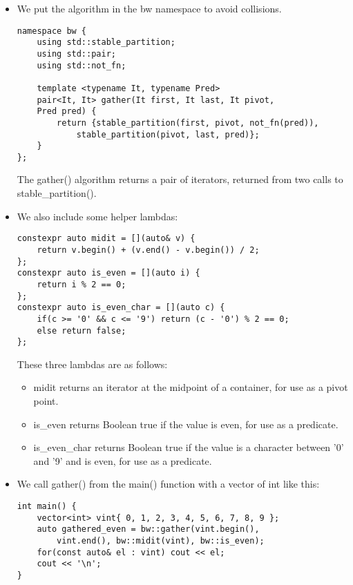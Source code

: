 \begin{itemize}
\item 
We put the algorithm in the bw namespace to avoid collisions.

\begin{lstlisting}[style=styleCXX]
namespace bw {
	using std::stable_partition;
	using std::pair;
	using std::not_fn;
	
	template <typename It, typename Pred>
	pair<It, It> gather(It first, It last, It pivot,
	Pred pred) {
		return {stable_partition(first, pivot, not_fn(pred)),
			stable_partition(pivot, last, pred)};
	}
};
\end{lstlisting}

The gather() algorithm returns a pair of iterators, returned from two calls to stable\_partition().

\item 
We also include some helper lambdas:

\begin{lstlisting}[style=styleCXX]
constexpr auto midit = [](auto& v) {
	return v.begin() + (v.end() - v.begin()) / 2;
};
constexpr auto is_even = [](auto i) {
	return i % 2 == 0;
};
constexpr auto is_even_char = [](auto c) {
	if(c >= '0' && c <= '9') return (c - '0') % 2 == 0;
	else return false;
};
\end{lstlisting}

These three lambdas are as follows:

\begin{itemize}
\item 
midit returns an iterator at the midpoint of a container, for use as a pivot point.

\item 
is\_even returns Boolean true if the value is even, for use as a predicate.

\item 
is\_even\_char returns Boolean true if the value is a character between '0' and '9' and is even, for use as a predicate.
\end{itemize}

\item 
We call gather() from the main() function with a vector of int like this:

\begin{lstlisting}[style=styleCXX]
int main() {
	vector<int> vint{ 0, 1, 2, 3, 4, 5, 6, 7, 8, 9 };
	auto gathered_even = bw::gather(vint.begin(),
		vint.end(), bw::midit(vint), bw::is_even);
	for(const auto& el : vint) cout << el;
	cout << '\n';
}
\end{lstlisting}


\end{itemize}
